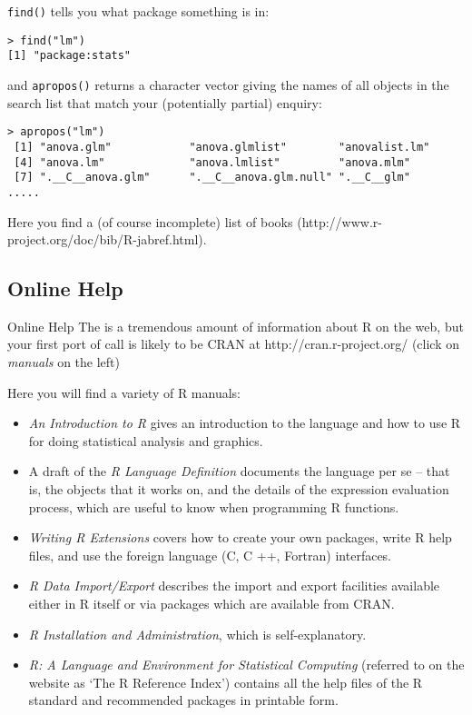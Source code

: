 \documentclass[12pt]{article}
\begin{document}
\texttt{find()} tells you what package something is in:
\begin{verbatim}
> find("lm")
[1] "package:stats"
\end{verbatim}

and \texttt{apropos()} returns a character vector giving the names of all objects in the search list that match your (potentially partial) enquiry:

\begin{verbatim}
> apropos("lm")
 [1] "anova.glm"            "anova.glmlist"        "anovalist.lm"        
 [4] "anova.lm"             "anova.lmlist"         "anova.mlm"           
 [7] ".__C__anova.glm"      ".__C__anova.glm.null" ".__C__glm"     
.....
\end{verbatim}

Here you find a (of course incomplete) list of books (http://www.r-project.org/doc/bib/R-jabref.html). 

\subsection{Online Help}
Online Help
The is a tremendous amount of information about R on the web, but your first port of call is likely to be CRAN at http://cran.r-project.org/ (click on \emph{manuals} on the left)

Here you will find a variety of R manuals:
\begin{itemize}
\item \emph{An Introduction to R} gives an introduction to the language and how to use R for doing
statistical analysis and graphics.
\item A draft of the \emph{R Language Definition} documents the language per se – that is, the objects
that it works on, and the details of the expression evaluation process, which are useful
to know when programming R functions.
\item \emph{Writing R Extensions} covers how to create your own packages, write R help files, and
use the foreign language (C, C ++, Fortran) interfaces.
\item \emph{R Data Import/Export} describes the import and export facilities available either in R
itself or via packages which are available from CRAN.
\item \emph{R Installation and Administration}, which is self-explanatory.
\item \emph{R: A Language and Environment for Statistical Computing} (referred to on the website as
‘The R Reference Index’) contains all the help files of the R standard and recommended packages in printable form.
\end{itemize}
\end{document}
